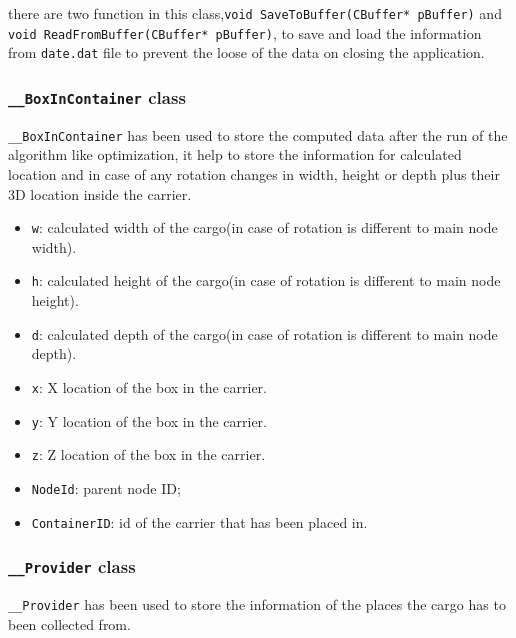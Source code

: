 \documentclass[oneside,titlepage,12pt]{memoir}
\begin{document}
there are two function in this
class,\texttt{void SaveToBuffer(CBuffer* pBuffer)} and
\texttt{void ReadFromBuffer(CBuffer* pBuffer)}, to save and load the
information from \texttt{date.dat} file to prevent the loose of the data
on closing the application.

\subsubsection{\texttt{\_\_BoxInContainer}
class}\label{boxincontainer-class}

\texttt{\_\_BoxInContainer} has been used to store the computed data
after the run of the algorithm like optimization, it help to store the
information for calculated location and in case of any rotation changes
in width, height or depth plus their 3D location inside the carrier.

\begin{itemize}
\itemsep1pt\parskip0pt
\item
  \texttt{w}: calculated width of the cargo(in case of rotation is
  different to main node width).
\item
  \texttt{h}: calculated height of the cargo(in case of rotation is
  different to main node height).
\item
  \texttt{d}: calculated depth of the cargo(in case of rotation is
  different to main node depth).
\item
  \texttt{x}: X location of the box in the carrier.
\item
  \texttt{y}: Y location of the box in the carrier.
\item
  \texttt{z}: Z location of the box in the carrier.
\item
  \texttt{NodeId}: parent node ID;
\item
  \texttt{ContainerID}: id of the carrier that has been placed in.
\end{itemize}

\subsubsection{\texttt{\_\_Provider} class}\label{provider-class}

\texttt{\_\_Provider} has been used to store the information of the
places the cargo has to been collected from.
\end{document}
